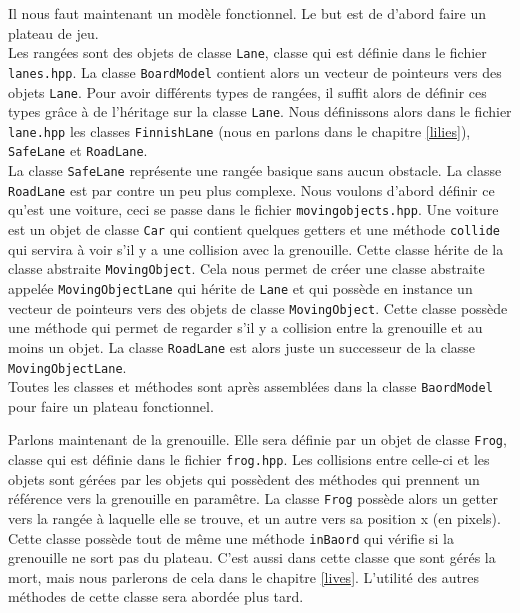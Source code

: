 \documentclass[a4paper, 12pt]{article}
\begin{document}
Il nous faut maintenant un modèle fonctionnel. Le but est de d'abord faire un plateau de jeu. \\

Les rangées sont des objets de classe \texttt{Lane}, classe qui est définie dans le fichier \texttt{lanes.hpp}. La classe \texttt{BoardModel} contient alors un vecteur de pointeurs vers des objets \texttt{Lane}. Pour avoir différents types de rangées, il suffit alors de définir ces types grâce à de l'héritage sur la classe \texttt{Lane}. Nous définissons alors dans le fichier \texttt{lane.hpp} les classes \texttt{FinnishLane} (nous en parlons dans le chapitre \ref{lilies}), \texttt{SafeLane} et \texttt{RoadLane}. \\

La classe \texttt{SafeLane} représente une rangée basique sans aucun obstacle. La classe \texttt{RoadLane} est par contre un peu plus complexe. Nous voulons d'abord définir ce qu'est une voiture, ceci se passe dans le fichier \texttt{movingobjects.hpp}. Une voiture est un objet de classe \texttt{Car} qui contient quelques getters et une méthode \texttt{collide} qui servira à voir s'il y a une collision avec la grenouille. Cette classe hérite de la classe abstraite \texttt{MovingObject}. Cela nous permet de créer une classe abstraite appelée \texttt{MovingObjectLane} qui hérite de \texttt{Lane} et qui possède en instance un vecteur de pointeurs vers des objets de classe \texttt{MovingObject}. Cette classe possède une méthode qui permet de regarder s'il y a collision entre la grenouille et au moins un objet. La classe \texttt{RoadLane} est alors juste un successeur de la classe \texttt{MovingObjectLane}. \\

Toutes les classes et méthodes sont après assemblées dans la classe \texttt{BaordModel} pour faire un plateau fonctionnel.

Parlons maintenant de la grenouille. Elle sera définie par un objet de classe \texttt{Frog}, classe qui est définie dans le fichier \texttt{frog.hpp}. Les collisions entre celle-ci et les objets sont gérées par les objets qui possèdent des méthodes qui prennent un référence vers la grenouille en paramêtre. La classe \texttt{Frog} possède alors un getter vers la rangée à laquelle elle se trouve, et un autre vers sa position x (en pixels). Cette classe possède tout de même une méthode \texttt{inBaord} qui vérifie si la grenouille ne sort pas du plateau. C'est aussi dans cette classe que sont gérés la mort, mais nous parlerons de cela dans le chapitre \ref{lives}. L'utilité des autres méthodes de cette classe sera abordée plus tard.
\end{document}
